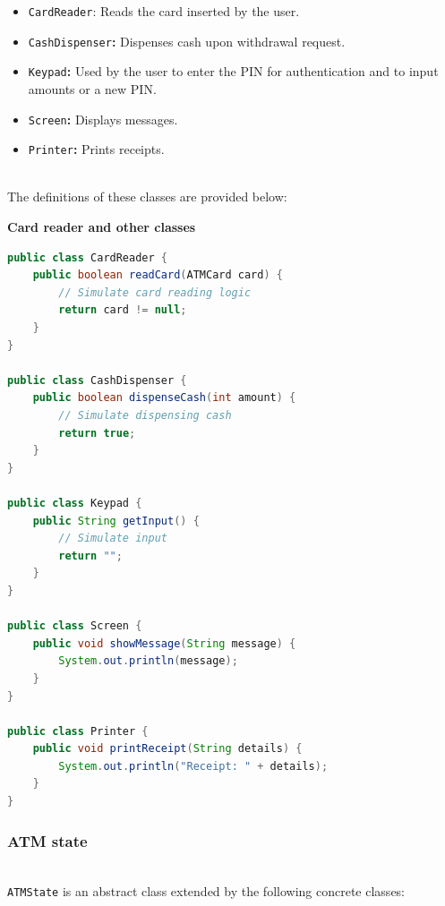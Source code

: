 \begin{itemize}
\item
\protect{}\label{XjtfTTIloQLt1R2IDn933}
\texttt{CardReader}: Reads the card inserted by the user.
\item
\protect{}\label{HxgcmfBuht-nK7VRXnwfM}
\texttt{CashDispenser}\textbf{:} Dispenses cash upon withdrawal request.
\item
\protect{}\label{yvbFIRaIYmQ2wRrL956Ig}
\texttt{Keypad}\textbf{:} Used by the user to enter the PIN for authentication and to input amounts or a new PIN.
\item
\protect{}\label{5sAFpsnGkfPWV9fYjPbbI}
\texttt{Screen}\textbf{:} Displays messages.
\item
\protect{}\label{sOE18OUPnGciys0Pg_a4N}
\texttt{Printer}\textbf{:} Prints receipts.
\end{itemize}
\\
The definitions of these classes are provided below:

\textbf{Card reader and other classes}

\begin{lstlisting}[language=Java]
public class CardReader {
    public boolean readCard(ATMCard card) {
        // Simulate card reading logic
        return card != null;
    }
}

public class CashDispenser {
    public boolean dispenseCash(int amount) {
        // Simulate dispensing cash
        return true;
    }
}

public class Keypad {
    public String getInput() {
        // Simulate input
        return "";
    }
}

public class Screen {
    public void showMessage(String message) {
        System.out.println(message);
    }
}

public class Printer {
    public void printReceipt(String details) {
        System.out.println("Receipt: " + details);
    }
}
\end{lstlisting}

\subsubsection{ATM state}\label{qoERsk9MnjoBfMB4T6sUi}
\\
\texttt{ATMState} is an abstract class extended by the following concrete classes:

